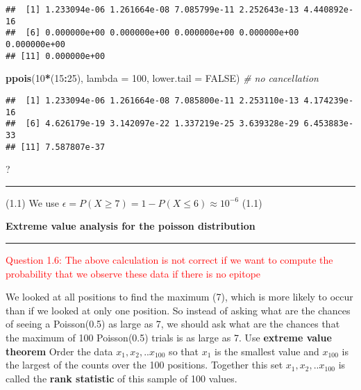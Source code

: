 \documentclass[]{article}
\newenvironment{Shaded}{\begin{snugshade}}{\end{snugshade}}
\newcommand{\KeywordTok}[1]{\textcolor[rgb]{0.13,0.29,0.53}{\textbf{#1}}}
\newcommand{\DataTypeTok}[1]{\textcolor[rgb]{0.13,0.29,0.53}{#1}}
\newcommand{\DecValTok}[1]{\textcolor[rgb]{0.00,0.00,0.81}{#1}}
\newcommand{\CommentTok}[1]{\textcolor[rgb]{0.56,0.35,0.01}{\textit{#1}}}
\newcommand{\OtherTok}[1]{\textcolor[rgb]{0.56,0.35,0.01}{#1}}
\newcommand{\OperatorTok}[1]{\textcolor[rgb]{0.81,0.36,0.00}{\textbf{#1}}}
\newcommand{\NormalTok}[1]{#1}
\let\oldrule=\rule
\renewcommand{\rule}[1]{\oldrule{\linewidth}}
\begin{document}
\begin{verbatim}
##  [1] 1.233094e-06 1.261664e-08 7.085799e-11 2.252643e-13 4.440892e-16
##  [6] 0.000000e+00 0.000000e+00 0.000000e+00 0.000000e+00 0.000000e+00
## [11] 0.000000e+00
\end{verbatim}

\begin{Shaded}
\begin{Highlighting}[]
\KeywordTok{ppois}\NormalTok{(}\DecValTok{10}\OperatorTok{*}\NormalTok{(}\DecValTok{15}\OperatorTok{:}\DecValTok{25}\NormalTok{), }\DataTypeTok{lambda =} \DecValTok{100}\NormalTok{, }\DataTypeTok{lower.tail =} \OtherTok{FALSE}\NormalTok{)  }\CommentTok{# no cancellation}
\end{Highlighting}
\end{Shaded}

\begin{verbatim}
##  [1] 1.233094e-06 1.261664e-08 7.085800e-11 2.253110e-13 4.174239e-16
##  [6] 4.626179e-19 3.142097e-22 1.337219e-25 3.639328e-29 6.453883e-33
## [11] 7.587807e-37
\end{verbatim}

?

\begin{center}\rule{0.5\linewidth}{\linethickness}\end{center}

(1.1) We use
\(\epsilon = P(X \geq 7) = 1 - P(X \leq 6) \approx 10^{-6}\) (1.1)

\textbf{Extreme value analysis for the poisson distribution}

\begin{center}\rule{0.5\linewidth}{\linethickness}\end{center}

\textcolor{red}{Question 1.6: The above calculation is not correct if we want to compute the probability that we observe these data if there is no epitope}

We looked at all positions to find the maximum (7), which is more likely
to occur than if we looked at only one position. So instead of asking
what are the chances of seeing a Poisson(0.5) as large as 7, we should
ask what are the chances that the maximum of 100 Poisson(0.5) trials is
as large as 7. Use \textbf{extreme value theorem} Order the data
\(x_1, x_2, .. x_{100}\) so that \(x_{1}\) is the smallest value and
\(x_{100}\) is the largest of the counts over the 100 positions.
Together this set \(x_1, x_2, .. x_{100}\) is called the \textbf{rank
statistic} of this sample of 100 values.
\end{document}
